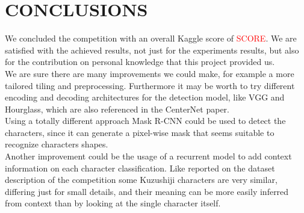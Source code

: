 \section{CONCLUSIONS}
\label{sec:conclusions}

We concluded the competition with an overall Kaggle score of \textcolor{red}{SCORE}.
We are satisfied with the achieved results, not just for the experiments results, but also for the contribution on personal knowledge that this project provided us.\\
We are sure there are many improvements we could make, for example a more tailored tiling and preprocessing. Furthermore it may be worth to try different encoding and decoding architectures for the detection model, like VGG and Hourglass, which are also referenced in the CenterNet paper.\\
Using a totally different approach Mask R-CNN could be used to detect the characters, since it can generate a pixel-wise mask that seems suitable to recognize characters shapes.\\
Another improvement could be the usage of a recurrent model to add context information on each character classification. Like reported on the dataset description of the competition some Kuzushiji characters are very similar, differing just for small details, and their meaning can be more easily inferred from context than by looking at the single character itself.\\
